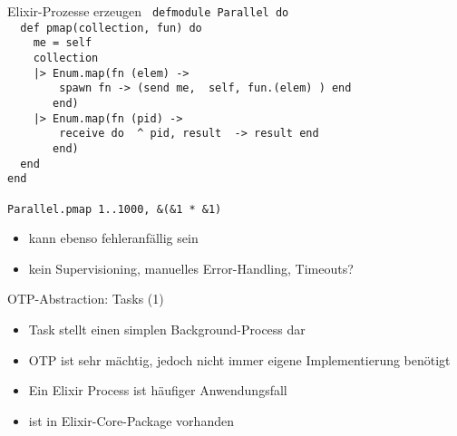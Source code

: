 \documentclass[compress]{beamer}
\begin{document}
  \begin{frame}{Elixir-Prozesse erzeugen}
    \texttt{
defmodule Parallel do\\
~~def pmap(collection, fun) do\\
~~~~me = self\\
~~~~collection\\
~~~~|> Enum.map(fn (elem) ->\\
~~~~~~~~spawn fn -> (send me, { self, fun.(elem) }) end\\
~~~~~~~end)\\
~~~~|> Enum.map(fn (pid) ->\\
~~~~~~~~receive do { \^~pid, result } -> result end\\
~~~~~~~end)\\
~~end\\
end\\
    ~\\
    Parallel.pmap 1..1000, \&(\&1 * \&1)\\
  } 
    \begin{itemize}
      \item<2-2> kann ebenso fehleranfällig sein
      \item<2-2> kein Supervisioning, manuelles Error-Handling, Timeouts?
    \end{itemize}
  \end{frame}
  \begin{frame}{OTP-Abstraction: Tasks (1)}
    \begin{itemize}
      \item Task stellt einen simplen Background-Process dar
      \item OTP ist sehr mächtig, jedoch nicht immer eigene Implementierung benötigt
      \item Ein Elixir Process ist häufiger Anwendungsfall
      \item ist in Elixir-Core-Package vorhanden
    \end{itemize}
  \end{frame}
  
\end{document}
